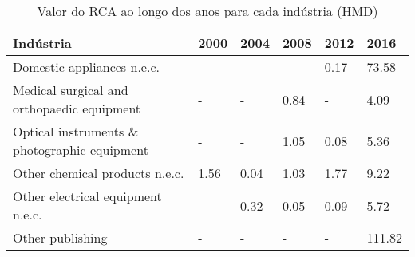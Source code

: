 \begin{table}
\centering
\caption{Valor do RCA ao longo dos anos para cada indústria (HMD)}
\begin{tabular}{p{6cm}p{1.5cm}p{1.5cm}p{1.5cm}p{1.5cm}p{1.5cm}}
\toprule
                                   Indústria & 2000 & 2004 & 2008 & 2012 &   2016 \\
\midrule
                  Domestic appliances n.e.c. &    - &    - &    - & 0.17 &  73.58 \\
  Medical surgical and orthopaedic equipment &    - &    - & 0.84 &    - &   4.09 \\
Optical instruments \& photographic equipment &    - &    - & 1.05 & 0.08 &   5.36 \\
              Other chemical products n.e.c. & 1.56 & 0.04 & 1.03 & 1.77 &   9.22 \\
           Other electrical equipment n.e.c. &    - & 0.32 & 0.05 & 0.09 &   5.72 \\
                            Other publishing &    - &    - &    - &    - & 111.82 \\
\bottomrule
\end{tabular}
\end{table}
